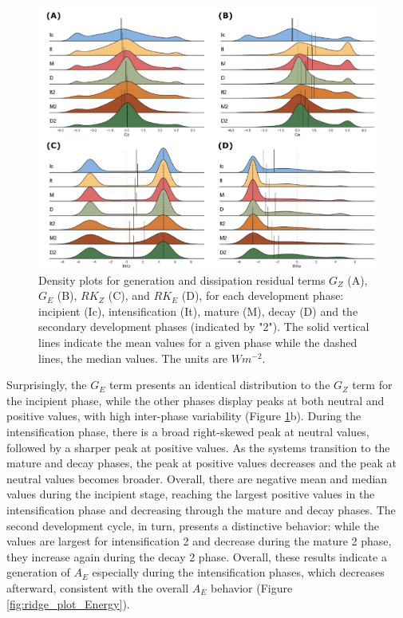 \begin{figure}[!htbp]
\centering
\includegraphics[width=\textwidth]{figs_5/ridge_plot_Generation and Dissipation Terms.pdf}
\caption[Density Plots - Energy Terms]{Density plots for generation and dissipation residual terms $G_Z$ (A), $G_E$ (B), $RK_Z$ (C), and $RK_E$ (D), for each development phase: incipient (Ic), intensification (It), mature (M), decay (D) and the secondary development phases (indicated by "2"). The solid vertical lines indicate the mean values for a given phase while the dashed lines, the median values. The units are $W m^{-2}$.}
\label{fig:ridge_plot_Generation}
\end{figure}

Surprisingly, the $G_E$ term presents an identical distribution to the $G_Z$ term for the incipient phase, while the other phases display peaks at both neutral and positive values, with high inter-phase variability (Figure \ref{fig:ridge_plot_Generation}b). During the intensification phase, there is a broad right-skewed peak at neutral values, followed by a sharper peak at positive values. As the systems transition to the mature and decay phases, the peak at positive values decreases and the peak at neutral values becomes broader. Overall, there are negative mean and median values during the incipient stage, reaching the largest positive values in the intensification phase and decreasing through the mature and decay phases. The second development cycle, in turn, presents a distinctive behavior: while the values are largest for intensification 2 and decrease during the mature 2 phase, they increase again during the decay 2 phase. Overall, these results indicate a generation of $A_E$ especially during the intensification phases, which decreases afterward, consistent with the overall $A_E$ behavior (Figure \ref{fig:ridge_plot_Energy}).

